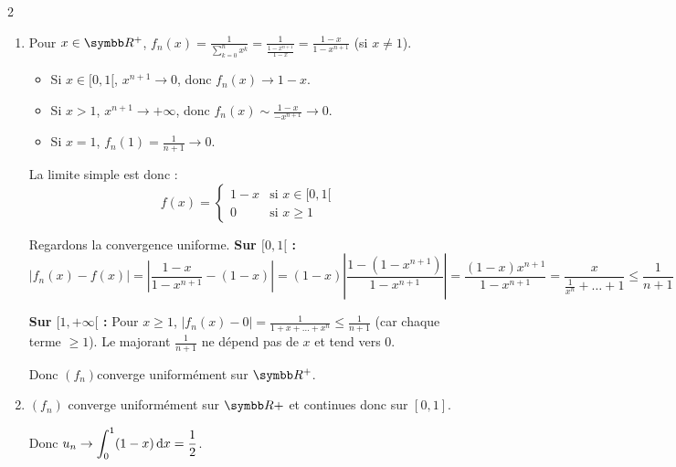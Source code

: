 \begin{correction}{2}
\begin{enumerate}
    \item 
    Pour $x \in \R^+$, $f_n(x) = \frac{1}{\sum_{k=0}^n x^k} = \frac{1}{\frac{1-x^{n+1}}{1-x}} = \frac{1-x}{1-x^{n+1}}$ (si $x \neq 1$).
    \begin{itemize}
        \item Si $x \in [0, 1[$, $x^{n+1} \to 0$, donc $f_n(x) \to 1-x$.
        \item Si $x > 1$, $x^{n+1} \to +\infty$, donc $f_n(x) \sim \frac{1-x}{-x^{n+1}} \to 0$.
        \item Si $x = 1$, $f_n(1) = \frac{1}{n+1} \to 0$.
    \end{itemize}
    La limite simple est donc :
    \[f(x) = \begin{cases} 1-x & \text{si } x \in [0, 1[ \\ 0 & \text{si } x \geqslant 1 \end{cases}\]

    Regardons la convergence uniforme.
    \textbf{Sur $[0, 1[$ :}
    \[|f_n(x) - f(x)| = \left| \frac{1-x}{1-x^{n+1}} - (1-x) \right| = (1-x) \left| \frac{1 - (1-x^{n+1})}{1-x^{n+1}} \right| = \frac{(1-x)x^{n+1}}{1-x^{n+1}}  = \frac x {\frac 1 {x^n} + \dots + 1} \leqslant \frac 1 {n + 1}\]

    \textbf{Sur $[1, +\infty[$ :}
    Pour $x \ge 1$, $|f_n(x) - 0| = \frac{1}{1+x+\dots+x^n} \leqslant \frac{1}{n+1}$ (car chaque terme $\geqslant 1$).
    Le majorant $\frac{1}{n+1}$ ne dépend pas de $x$ et tend vers 0.

    Donc $(f_n)$converge uniformément sur $\R^+$.

    \item $(f_n)$ converge uniformément sur $\R+$ et continues donc sur $[0,1]$.

    Donc $\displaystyle u_n \to \int_0^1 (1 - x) \,\mathrm{d}x = \frac 1 2$.
\end{enumerate}
\end{correction}


